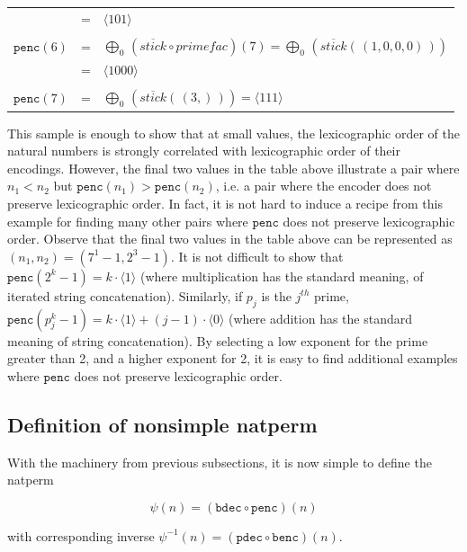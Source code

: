 \documentclass[12pt,reqno]{article}
\begin{document}
\begin{center}
\begin{tabular}{l c l}
                              & = & $\langle 101 \rangle$ \\
  \\
  $\texttt{penc}(6)$ & = & $\bigoplus_0 \, (\overline{stick} \circ primefac) (7) = \bigoplus_0 \, (\overline{stick} (\, (1, 0, 0, 0) \, )) $ \\
                              & = & $\langle 1000 \rangle$ \\
  \\
  $\texttt{penc}(7)$ & = & $\bigoplus_0 \, (\overline{stick} (\, (3,) \, )) = \langle 111 \rangle$ \\
\end{tabular} \end{center}

This sample is enough to show that at small values, the lexicographic order of the natural numbers is strongly correlated with lexicographic order of their encodings. However, the final two values in the table above illustrate a pair where $n_1 < n_2$ but $\texttt{penc}(n_1) > \texttt{penc}(n_2)$, i.e. a pair where the encoder does not preserve lexicographic order. In fact, it is not hard to induce a recipe from this example for finding many other pairs where $\texttt{penc}$ does not preserve lexicographic order. Observe that the final two values in the table above can be represented as $(n_1, n_2) = (7^1 - 1, 2^3 - 1)$. It is not difficult to show that $\texttt{penc}(2^k - 1) = k \cdot \langle 1 \rangle$ (where multiplication has the standard meaning, of iterated string concatenation). Similarly, if $p_j$ is the $j^{th}$ prime, $\texttt{penc}(p_j^k - 1) = k \cdot \langle 1 \rangle + (j - 1) \cdot \langle 0 \rangle$ (where addition has the standard meaning of string concatenation). By selecting a low exponent for the prime greater than 2, and a higher exponent for 2, it is easy to find additional examples where $\texttt{penc}$ does not preserve lexicographic order.

\subsection{Definition of nonsimple natperm}

With the machinery from previous subsections, it is now simple to define the natperm

\begin{equation}
    \psi(n) = ( \texttt{bdec} \circ \texttt{penc} ) (n)
\end{equation}

with corresponding inverse $\psi^{-1}(n) = ( \texttt{pdec}  \circ \texttt{benc} ) (n)$.
\end{document}
